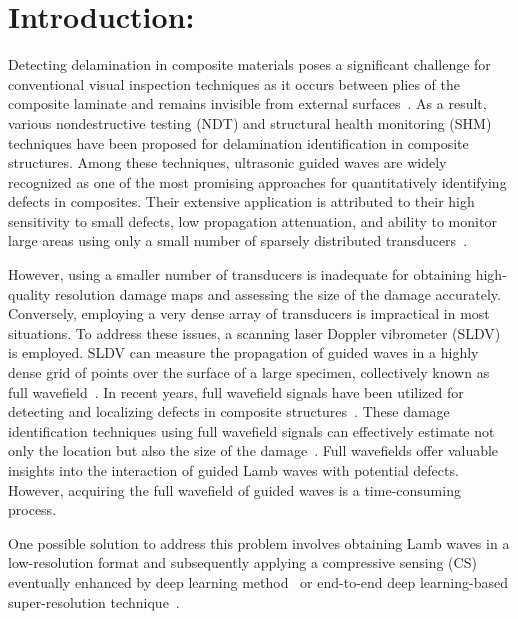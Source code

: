 \section{Introduction:}

Detecting delamination in composite materials poses a significant challenge for 
conventional visual inspection techniques as it occurs between plies of the 
composite laminate and remains invisible from external 
surfaces~\cite{staszewski2009health, tuo2019damage}. 
As a result, various nondestructive testing (NDT) and structural health monitoring (SHM) techniques have been proposed for delamination identification in composite structures. 
Among these techniques, ultrasonic guided waves are widely recognized as one of 
the most promising approaches for quantitatively identifying defects in 
composites. 
Their extensive application is attributed to their high sensitivity to small defects, low propagation attenuation, and ability to monitor large areas using only a small number of sparsely distributed transducers~\cite{Barthorpe2020, Ihn2008, Cantero-Chinchilla2020}.

However, using a smaller number of transducers is inadequate for obtaining high-quality resolution damage maps and assessing the size of the damage accurately. 
Conversely, employing a very dense array of transducers is impractical in most situations. To address these issues, a scanning laser Doppler vibrometer (SLDV) is employed. 
SLDV can measure the propagation of guided waves in a highly dense grid of points over the surface of a large specimen, collectively known as full wavefield~\cite{Radzienski2019a}. 
In recent years, full wavefield signals have been utilized for detecting and localizing defects in composite structures~\cite{Radzienski2019a, Girolamo2018a, kudela2018impact, rogge2013characterization}. 
These damage identification techniques using full wavefield signals can effectively estimate 
not only the location but also the size of the damage~\cite{Girolamo2018a, kudela2018impact}. 
Full wavefields offer valuable insights into the interaction of guided Lamb waves with potential defects. However, acquiring the full wavefield of guided waves is a time-consuming process.

One possible solution to address this problem involves obtaining Lamb waves in a low-resolution format and subsequently applying a compressive sensing (CS) eventually enhanced by deep learning method~\cite{esfandabadideep} or end-to-end deep learning-based super-resolution technique~\cite{ijjeh2023deep}. 

